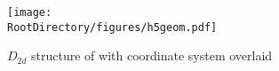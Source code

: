 \begin{figure}[ht]
\begin{center}
    \texttt{[image: \\RootDirectory/figures/h5geom.pdf]}
    \caption{
    $D_{2d}$ structure of \hfive{} with coordinate system overlaid
}
\label{fig:h5geom}
\end{center}
\end{figure}
